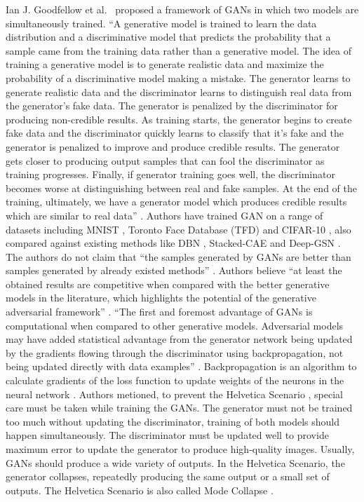Ian J. Goodfellow et al.\ \cite{goodfellow2014generative} proposed a framework of \acp{GAN} in which two models are simultaneously trained. ``A generative model is trained to learn the data distribution and a discriminative model that predicts the probability that a sample came from the training data rather than a generative model. The idea of training a generative model is to generate realistic data and maximize the probability of a discriminative model making a mistake. The generator learns to generate realistic data and the discriminator learns to distinguish real data from the generator's fake data. The generator is penalized by the discriminator for producing non-credible results. As training starts, the generator begins to create fake data and the discriminator quickly learns to classify that it's fake and the generator is penalized to improve and produce credible results. The generator gets closer to producing output samples that can fool the discriminator as training progresses. Finally, if generator training goes well, the discriminator becomes worse at distinguishing between real and fake samples.  At the end of the training, ultimately, we have a generator model which produces credible results which are similar to real data'' \cite{goodfellow2014generative}. Authors have trained \ac{GAN} on a range of datasets including MNIST \cite{726791}, Toronto Face Database (TFD) \cite{susskind2010toronto} and CIFAR-10 \cite{krizhevsky2009learning}, also compared against existing methods like \ac{DBN} \cite{bengio2012better}, \ac{Stacked-CAE} \cite{bengio2012better} and \ac{Deep-GSN} \cite{bengio2014deep}. The authors do not claim that ``the samples generated by \acp{GAN} are better than samples generated by already existed methods'' \cite{goodfellow2014generative}. Authors believe ``at least the obtained results are competitive when compared with the better generative models in the literature, which highlights the potential of the generative adversarial framework'' \cite{goodfellow2014generative}. ``The first and foremost advantage of \acp{GAN} is computational when compared to other generative models. Adversarial models may have added statistical advantage from the generator network being updated by the gradients flowing through the discriminator using backpropagation, not being updated directly with data examples'' \cite{goodfellow2014generative}. Backpropagation is an algorithm to calculate gradients of the loss function to update weights of the neurons in the neural network \cite{goodfellow2017deep}. Authors metioned, to prevent the Helvetica Scenario \cite{manisha2019generative}, special care must be taken while training the \acp{GAN}. The generator must not be trained too much without updating the discriminator, training of both models should happen simultaneously. The discriminator must be updated well to provide maximum error to update the generator to produce high-quality images. Usually, \acp{GAN} should produce a wide variety of outputs. In the Helvetica Scenario, the generator collapses, repeatedly producing the same output or a small set of outputs. The Helvetica Scenario is also called Mode Collapse \cite{thanhtung2020catastrophic}.

